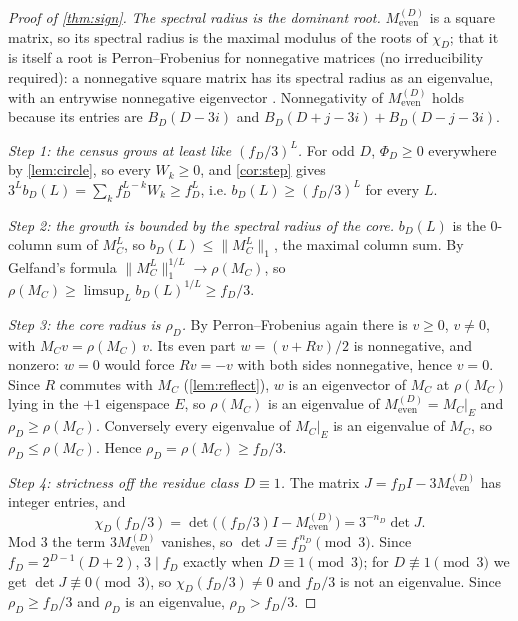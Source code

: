 \documentclass[11pt]{amsart}
\theoremstyle{definition}
\theoremstyle{remark}
\begin{document}
\begin{proof}[Proof of \cref{thm:sign}]
\emph{The spectral radius is the dominant root.} $M_{\mathrm{even}}^{(D)}$ is a square matrix, so its spectral radius is the maximal modulus of the roots of $\chi_D$; that it is itself a root is Perron--Frobenius for nonnegative matrices (no irreducibility required): a nonnegative square matrix has its spectral radius as an eigenvalue, with an entrywise nonnegative eigenvector \cite[Theorem 8.3.1]{hornjohnson}. Nonnegativity of $M_{\mathrm{even}}^{(D)}$ holds because its entries are $B_D(D-3i)$ and $B_D(D+j-3i) + B_D(D-j-3i)$.

\emph{Step 1: the census grows at least like $(f_D/3)^L$.} For odd $D$, $\Phi_D \ge 0$ everywhere by \cref{lem:circle}, so every $W_k \ge 0$, and \cref{cor:step} gives $3^L b_D(L) = \sum_k f_D^{L-k} W_k \ge f_D^L$, i.e. $b_D(L) \ge (f_D/3)^L$ for every $L$.

\emph{Step 2: the growth is bounded by the spectral radius of the core.} $b_D(L)$ is the $0$-column sum of $M_C^L$, so $b_D(L) \le \lVert M_C^L \rVert_1$, the maximal column sum. By Gelfand's formula $\lVert M_C^L \rVert_1^{1/L} \to \rho(M_C)$, so $\rho(M_C) \ge \limsup_L b_D(L)^{1/L} \ge f_D/3$.

\emph{Step 3: the core radius is $\rho_D$.} By Perron--Frobenius again there is $v \ge 0$, $v \ne 0$, with $M_C v = \rho(M_C)\, v$. Its even part $w = (v + Rv)/2$ is nonnegative, and nonzero: $w = 0$ would force $Rv = -v$ with both sides nonnegative, hence $v = 0$. Since $R$ commutes with $M_C$ (\cref{lem:reflect}), $w$ is an eigenvector of $M_C$ at $\rho(M_C)$ lying in the $+1$ eigenspace $E$, so $\rho(M_C)$ is an eigenvalue of $M_{\mathrm{even}}^{(D)} = M_C|_E$ and $\rho_D \ge \rho(M_C)$. Conversely every eigenvalue of $M_C|_E$ is an eigenvalue of $M_C$, so $\rho_D \le \rho(M_C)$. Hence $\rho_D = \rho(M_C) \ge f_D/3$.

\emph{Step 4: strictness off the residue class $D \equiv 1$.} The matrix $J = f_D I - 3 M_{\mathrm{even}}^{(D)}$ has integer entries, and
\[
\chi_D(f_D/3) = \det\bigl( (f_D/3) I - M_{\mathrm{even}}^{(D)} \bigr) = 3^{-n_D} \det J .
\]
Mod $3$ the term $3 M_{\mathrm{even}}^{(D)}$ vanishes, so $\det J \equiv f_D^{\,n_D} \pmod 3$. Since $f_D = 2^{D-1}(D+2)$, $3 \mid f_D$ exactly when $D \equiv 1 \pmod 3$; for $D \not\equiv 1 \pmod 3$ we get $\det J \not\equiv 0 \pmod 3$, so $\chi_D(f_D/3) \ne 0$ and $f_D/3$ is not an eigenvalue. Since $\rho_D \ge f_D/3$ and $\rho_D$ is an eigenvalue, $\rho_D > f_D/3$.
\end{proof}
\end{document}
